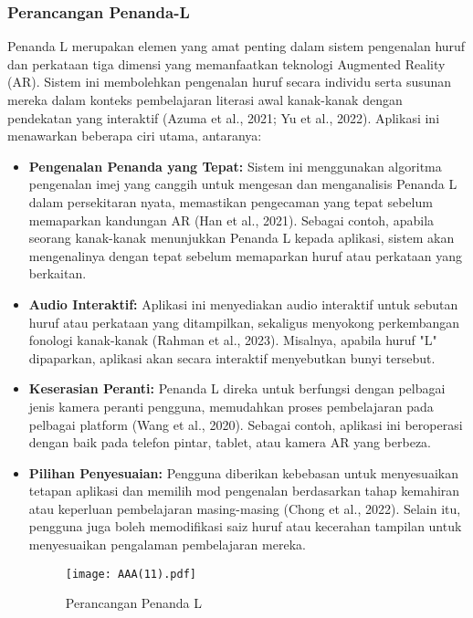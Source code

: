 \begin{itemize}
\begin{itemize}
\subsubsection{Perancangan Penanda-L}  
Penanda L merupakan elemen yang amat penting dalam sistem pengenalan huruf dan perkataan tiga dimensi yang memanfaatkan teknologi Augmented Reality (AR). Sistem ini membolehkan pengenalan huruf secara individu serta susunan mereka dalam konteks pembelajaran literasi awal kanak-kanak dengan pendekatan yang interaktif (Azuma et al., 2021; Yu et al., 2022). Aplikasi ini menawarkan beberapa ciri utama, antaranya:  \\  
\begin{itemize}  
\item \textbf{Pengenalan Penanda yang Tepat:} Sistem ini menggunakan algoritma pengenalan imej yang canggih untuk mengesan dan menganalisis Penanda L dalam persekitaran nyata, memastikan pengecaman yang tepat sebelum memaparkan kandungan AR (Han et al., 2021). Sebagai contoh, apabila seorang kanak-kanak menunjukkan Penanda L kepada aplikasi, sistem akan mengenalinya dengan tepat sebelum memaparkan huruf atau perkataan yang berkaitan.\\  
\item \textbf{Audio Interaktif:} Aplikasi ini menyediakan audio interaktif untuk sebutan huruf atau perkataan yang ditampilkan, sekaligus menyokong perkembangan fonologi kanak-kanak (Rahman et al., 2023). Misalnya, apabila huruf "L" dipaparkan, aplikasi akan secara interaktif menyebutkan bunyi tersebut.\\  
\item \textbf{Keserasian Peranti:} Penanda L direka untuk berfungsi dengan pelbagai jenis kamera peranti pengguna, memudahkan proses pembelajaran pada pelbagai platform (Wang et al., 2020). Sebagai contoh, aplikasi ini beroperasi dengan baik pada telefon pintar, tablet, atau kamera AR yang berbeza.\\  
\item \textbf{Pilihan Penyesuaian:} Pengguna diberikan kebebasan untuk menyesuaikan tetapan aplikasi dan memilih mod pengenalan berdasarkan tahap kemahiran atau keperluan pembelajaran masing-masing (Chong et al., 2022). Selain itu, pengguna juga boleh memodifikasi saiz huruf atau kecerahan tampilan untuk menyesuaikan pengalaman pembelajaran mereka.\\


\begin{figure}
    \centering
    \texttt{[image: AAA(11).pdf]}
    \caption{Perancangan Penanda L}
    \label{fig:enter-label}
\end{figure}
\vspace{1cm}




\end{itemize}
\end{itemize}
\end{itemize}
